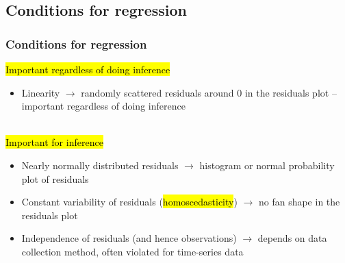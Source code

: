 \documentclass[slidestop,compress,mathserif,12pt,t,professionalfonts,xcolor=table]{beamer}
\begin{document}

\subsection{Conditions for regression}
\label{mi5}


\begin{frame}
\frametitle{Conditions for regression}

\hl{Important regardless of doing inference}

\begin{itemize}

\item Linearity $\rightarrow$ randomly scattered residuals around 0 in the residuals plot -- important regardless of doing inference

\end{itemize}

\pause

$\:$ \\

\hl{Important for inference}

\begin{itemize}

\item Nearly normally distributed residuals $\rightarrow$ histogram or normal probability plot of residuals

\pause

\item Constant variability of residuals (\hl{homoscedasticity}) $\rightarrow$ no fan shape in the residuals plot

\pause

\item Independence of residuals (and hence observations) $\rightarrow$ depends on data collection method, often violated for time-series data

\end{itemize}

\end{frame}

\end{document}

